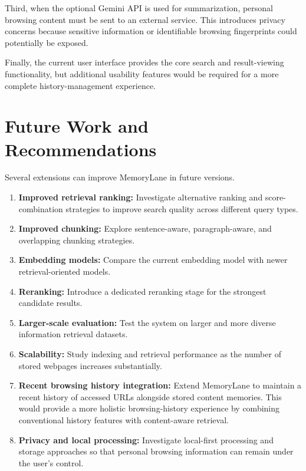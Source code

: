 \documentclass{tietreport}
\begin{document}
Third, when the optional Gemini API is used for summarization,
personal browsing content must be sent to an external service.
This introduces privacy concerns because sensitive information
or identifiable browsing fingerprints could potentially be exposed.

Finally, the current user interface provides the core search and
result-viewing functionality, but additional usability features
would be required for a more complete history-management
experience.

\section{Future Work and Recommendations}

Several extensions can improve MemoryLane in future versions.

\begin{enumerate}

    \item \textbf{Improved retrieval ranking:}
    Investigate alternative ranking and score-combination
    strategies to improve search quality across different query
    types.

    \item \textbf{Improved chunking:}
    Explore sentence-aware, paragraph-aware, and overlapping
    chunking strategies.

    \item \textbf{Embedding models:}
    Compare the current embedding model with newer
    retrieval-oriented models.

    \item \textbf{Reranking:}
    Introduce a dedicated reranking stage for the strongest
    candidate results.

    \item \textbf{Larger-scale evaluation:}
    Test the system on larger and more diverse information
    retrieval datasets.

    \item \textbf{Scalability:}
    Study indexing and retrieval performance as the number of
    stored webpages increases substantially.

    \item \textbf{Recent browsing history integration:}
    Extend MemoryLane to maintain a recent history of accessed
    URLs alongside stored content memories. This would provide
    a more holistic browsing-history experience by combining
    conventional history features with content-aware retrieval.

    \item \textbf{Privacy and local processing:}
    Investigate local-first processing and storage approaches
    so that personal browsing information can remain under the
    user's control.

\end{enumerate}
\end{document}

